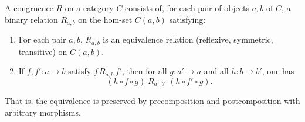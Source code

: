 A congruence $R$ on a category $C$ consists of, for each pair of objects $a, b$ of $C$, a binary relation $R_{a,b}$ on the hom-set $C(a, b)$ satisfying:

\begin{enumerate}
  \item For each pair $a, b$, $R_{a,b}$ is an equivalence relation (reflexive, symmetric, transitive) on $C(a, b)$.
  \item If $f, f' : a \to b$ satisfy $f \, R_{a,b} \, f'$, then for all $g : a' \to a$ and all $h : b \to b'$, one has
  $$(h \circ f \circ g) \; R_{a',b'} \; (h \circ f' \circ g).$$
\end{enumerate}

That is, the equivalence is preserved by precomposition and postcomposition with arbitrary morphisms.
